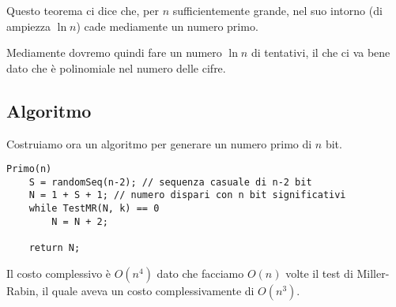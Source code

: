 Questo teorema ci dice che, per $n$ sufficientemente grande, nel suo intorno (di ampiezza $\ln n$) cade mediamente un
numero primo.

Mediamente dovremo quindi fare un numero $\ln n$ di tentativi, il che ci va bene dato che \`e polinomiale nel numero
delle cifre.

\subsection{Algoritmo}
Costruiamo ora un algoritmo per generare un numero primo di $n$ bit.

\begin{lstlisting}[style=pseudo-style]
Primo(n)
	S = randomSeq(n-2); // sequenza casuale di n-2 bit
	N = 1 + S + 1; // numero dispari con n bit significativi
	while TestMR(N, k) == 0 
		N = N + 2;

	return N;
\end{lstlisting}
Il costo complessivo \`e $O(n^4)$ dato che facciamo $O(n)$ volte il test di Miller-Rabin, il quale aveva un costo
complessivamente di $O(n^3)$.

